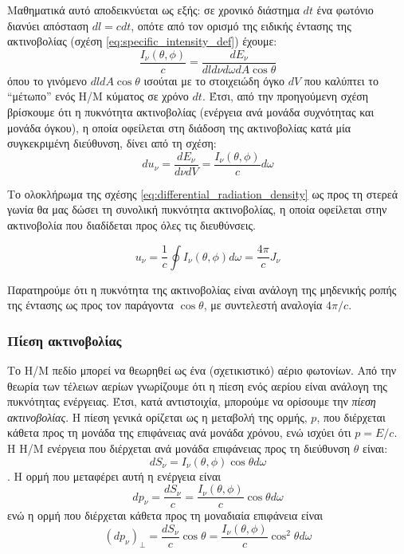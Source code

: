 Μαθηματικά αυτό αποδεικνύεται ως εξής: σε χρονικό διάστημα $dt$ ένα φωτόνιο διανύει απόσταση $dl = c dt$, οπότε από τον ορισμό της ειδικής έντασης της ακτινοβολίας (σχέση \eqref{eq:specific_intensity_def}) έχουμε:
\begin{equation*}
    \frac{I_{\nu} (\theta, \phi)}{c} = \frac{dE_{\nu}}{dl d\nu d\omega dA \cos \theta}
\end{equation*}
όπου το γινόμενο $dl dA \cos \theta$ ισούται με το στοιχειώδη όγκο $dV$ που καλύπτει το ``μέτωπο'' ενός Η/Μ κύματος σε χρόνο $dt$. Έτσι, από την προηγούμενη σχέση βρίσκουμε ότι η πυκνότητα ακτινοβολίας (ενέργεια ανά μονάδα συχνότητας και μονάδα όγκου), η οποία οφείλεται στη διάδοση της ακτινοβολίας κατά μία συγκεκριμένη διεύθυνση, δίνει από τη σχέση:
\begin{equation}
    \label{eq:differential_radiation_density}
    du_{\nu} = \frac{dE_{\nu}}{d\nu dV} = \frac{I_{\nu}(\theta, \phi)}{c} d\omega  
\end{equation}

Το ολοκλήρωμα της σχέσης \eqref{eq:differential_radiation_density} ως προς τη στερεά γωνία θα μας δώσει τη συνολική πυκνότητα ακτινοβολίας, η οποία οφείλεται στην ακτινοβολία που διαδίδεται προς όλες τις διευθύνσεις.

\begin{equation}
    \label{eq:radiation_density}
    u_{\nu} = \frac{1}{c} \oint I_{\nu}(\theta, \phi) d\omega = \frac{4\pi}{c} J_{\nu}
\end{equation}

Παρατηρούμε ότι η πυκνότητα της ακτινοβολίας είναι ανάλογη της μηδενικής ροπής της έντασης ως προς τον παράγοντα $\cos \theta$, με συντελεστή αναλογία $4\pi/c$.



\subsubsection{Πίεση ακτινοβολίας}
Το Η/Μ πεδίο μπορεί να θεωρηθεί ως ένα (σχετικιστικό) αέριο φωτονίων. Από την θεωρία των τέλειων αερίων γνωρίζουμε ότι η πίεση ενός αερίου είναι ανάλογη της πυκνότητας ενέργειας. Έτσι, κατά αντιστοιχία, μπορούμε να ορίσουμε την \textit{πίεση ακτινοβολίας}. Η πίεση γενικά ορίζεται ως η μεταβολή της ορμής, $p$, που διέρχεται κάθετα προς τη μονάδα της επιφάνειας ανά μονάδα χρόνου, ενώ ισχύει ότι $p = E/c$. Η Η/Μ ενέργεια που διέρχεται ανά μονάδα επιφάνειας προς τη διεύθυνση $\theta$ είναι: $$dS_{\nu} = I_{\nu}(\theta, \phi) \cos \theta d\omega$$. Η ορμή που μεταφέρει αυτή η ενέργεια είναι $$dp_{\nu} = \frac{dS_{\nu}}{c} = \frac{I_{\nu}(\theta, \phi)}{c} \cos \theta d\omega$$ ενώ η ορμή που διέρχεται κάθετα προς τη μοναδιαία επιφάνεια είναι $$(dp_{\nu})_{\perp} = \frac{dS_{\nu}}{c} \cos \theta = \frac{I_{\nu}(\theta, \phi)}{c} \cos^2 \theta d\omega$$

